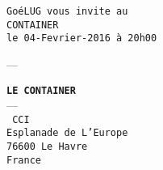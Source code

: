 \begin{slide}


\begin{center}
\texttt{GoéLUG vous invite au \\ CONTAINER} \\
\texttt{le 04-Fevrier-2016 \`a 20h00}

---

\texttt{\textbf{LE CONTAINER}} \\
--- \\
\texttt{
CCI \\
Esplanade de L'Europe \\
76600 Le Havre \\
France
}
\end{center}



\end{slide}